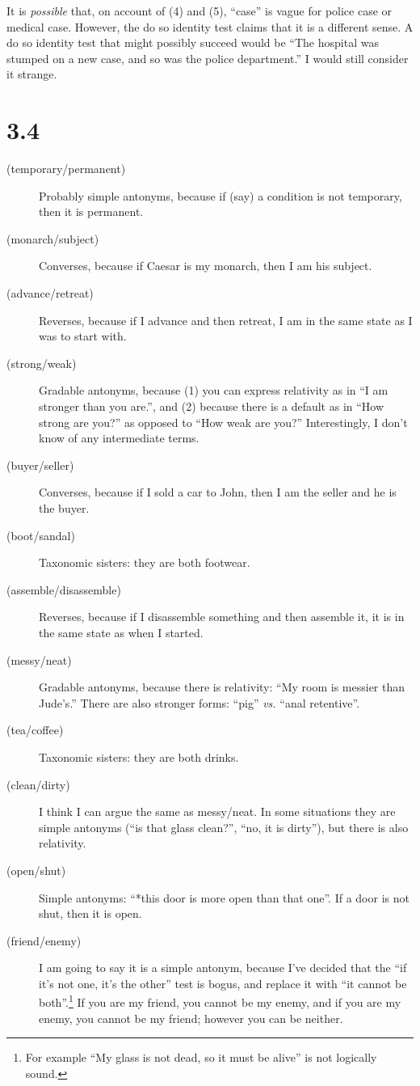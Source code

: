 \documentclass[12pt]{article}
\begin{document}
It is \textit{possible} that, on account of (4) and (5), ``case'' is
vague for police case or medical case.  However, the do so identity test
claims that it is a different sense.  A do so identity test that might
possibly succeed would be ``The hospital was stumped on a new case,
and so was the police department.''  I would still consider it strange.

\section*{3.4}
\begin{description}
\item[(temporary/permanent)] Probably simple antonyms, because if (say)
a condition is not temporary, then it is permanent.
\item[(monarch/subject)] Converses, because if Caesar is my monarch,
then I am his subject.
\item[(advance/retreat)] Reverses, because if I advance and then
retreat, I am in the same state as I was to start with.
\item[(strong/weak)] Gradable antonyms, because (1) you can express
relativity as in ``I am stronger than you are.'', and (2) because there
is a default as in ``How strong are you?'' as opposed to ``How weak are
you?''  Interestingly, I don't know of any intermediate terms.
\item[(buyer/seller)] Converses, because if I sold a car to John, then I
am the seller and he is the buyer.
\item[(boot/sandal)] Taxonomic sisters: they are both footwear.
\item[(assemble/disassemble)] Reverses, because if I disassemble
something and then assemble it, it is in the same state as when I
started.
\item[(messy/neat)] Gradable antonyms, because there is relativity: ``My
room is messier than Jude's.''  There are also stronger forms: ``pig''
\textit{vs.} ``anal retentive''.
\item[(tea/coffee)] Taxonomic sisters: they are both drinks.
\item[(clean/dirty)] I think I can argue the same as messy/neat.  In
some situations they are simple antonyms (``is that glass clean?'',
``no, it is dirty''), but there is also relativity.
\item[(open/shut)] Simple antonyms: ``*this door is more open than that
one''.  If a door is not shut, then it is open.
\item[(friend/enemy)] I am going to say it is a simple antonym, because
I've decided that the ``if it's not one, it's the other'' test is bogus,
and replace it with ``it cannot be both''.\footnote{For example ``My
glass is not dead, so it must be alive'' is not logically sound.}  If
you are my friend, you cannot be my enemy, and if you are my enemy, you
cannot be my friend; however you can be neither.
\end{description}
\end{document}
